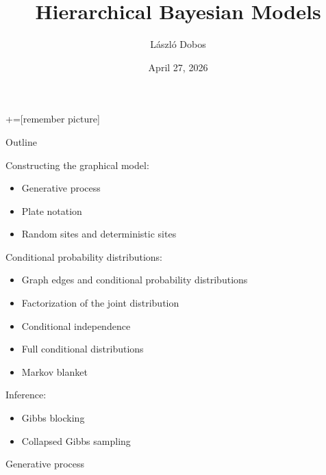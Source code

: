\documentclass[10pt,aspectratio=169]{beamer}
\title{Hierarchical Bayesian Models}
\author{László Dobos}
\date{April 27, 2026}
\newcommand{\bulletspace}{\vspace{0.5em}{}}
\begin{document}
+=[remember picture]

\begin{frame}
\titlepage
\end{frame}

\begin{frame}{Outline}

    Constructing the graphical model:
    \begin{itemize}
        \item Generative process
        \item Plate notation
        \item Random sites and deterministic sites
    \end{itemize}

    \bulletspace
    Conditional probability distributions:
    \begin{itemize}
        \item Graph edges and conditional probability distributions
        \item Factorization of the joint distribution
        \item Conditional independence
        \item Full conditional distributions
        \item Markov blanket
    \end{itemize}

    \bulletspace
    Inference:
    \begin{itemize}
        \item Gibbs blocking
        \item Collapsed Gibbs sampling
    \end{itemize}

\end{frame}

\begin{frame}{Generative process}
\end{frame}
\end{document}
